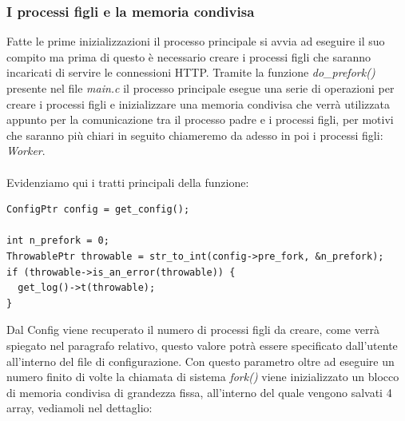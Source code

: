 \documentclass[italian]{tktltiki2}
\begin{document}
\subsubsection{I processi figli e la memoria condivisa}
\label{ssec:child_process}
Fatte le prime inizializzazioni il processo principale si avvia ad eseguire il suo compito ma prima di questo è necessario creare i processi figli che saranno incaricati di servire le connessioni HTTP. Tramite la funzione \emph{do\_prefork()} presente nel file \emph{main.c} il processo principale esegue una serie di operazioni per creare i processi figli e inizializzare una memoria condivisa che verrà utilizzata appunto per la comunicazione tra il processo padre e i processi figli, per motivi che saranno più chiari in seguito chiameremo da adesso in poi i processi figli: \emph{Worker}.
\\
\\
Evidenziamo qui i tratti principali della funzione:

\begin{lstlisting}
ConfigPtr config = get_config();

int n_prefork = 0;
ThrowablePtr throwable = str_to_int(config->pre_fork, &n_prefork);
if (throwable->is_an_error(throwable)) {
  get_log()->t(throwable);
}
\end{lstlisting}
Dal Config viene recuperato il numero di processi figli da creare, come verrà spiegato nel paragrafo relativo, questo valore potrà essere specificato dall'utente all'interno del file di configurazione. Con questo parametro oltre ad eseguire un numero finito di volte la chiamata di sistema \emph{fork()} viene inizializzato un blocco di memoria condivisa di grandezza fissa, all'interno del quale vengono salvati 4 array, vediamoli nel dettaglio:
\end{document}
